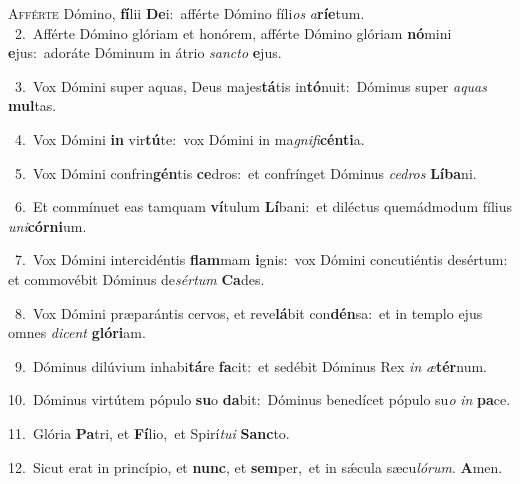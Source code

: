 \lettrine{\initial\textcolor{\initialcolor}{A}}{fférte} Dómino, \textbf{fí}\-lii \textbf{De}\-i:~\star afférte Dómino fíli\textit{os} \textit{a}\-\textbf{rí}\textbf{e}tum.\\
{\numbfont\textcolor{\numbcolor}{~2.}}~Afférte Dómino glóriam et honórem, afférte Dómino glóriam \textbf{nó}\-mini \textbf{e}\-jus:~\star adoráte Dóminum in átrio \textit{sanc}\-\textit{to} \textbf{e}\-jus.\par
{\numbfont\textcolor{\numbcolor}{~3.}}~Vox Dómini super aquas, Deus majes\-\textbf{tá}\-tis in\-\textbf{tó}\-nuit:~\star Dóminus super \textit{a}\-\textit{quas} \textbf{mul}\-tas.\par
{\numbfont\textcolor{\numbcolor}{~4.}}~Vox Dómini \textbf{in} vir\-\textbf{tú}\-te:~\star vox Dómini in ma\-\textit{gni}\-\textit{fi}\textbf{cén}\textbf{ti}a.\par
{\numbfont\textcolor{\numbcolor}{~5.}}~Vox Dómini confrin\-\textbf{gén}\-tis \textbf{ce}\-dros:~\star et confrínget Dóminus \textit{ce}\-\textit{dros} \textbf{Lí}\-\textbf{ba}ni.\par
{\numbfont\textcolor{\numbcolor}{~6.}}~Et commínuet eas tamquam \textbf{ví}\-tulum \textbf{Lí}\-bani:~\star et diléctus quemádmodum fílius \textit{u}\-\textit{ni}\textbf{cór}\textbf{ni}um.\par
{\numbfont\textcolor{\numbcolor}{~7.}}~Vox Dómini intercidéntis \textbf{flam}\-mam \textbf{i}\-gnis:~\star vox Dómini concutiéntis desértum: et commovébit Dóminus de\-\textit{sér}\-\textit{tum} \textbf{Ca}\-des.\par
{\numbfont\textcolor{\numbcolor}{~8.}}~Vox Dómini præparántis cervos, et reve\-\textbf{lá}\-bit con\-\textbf{dén}\-sa:~\star et in templo ejus omnes \textit{di}\-\textit{cent} \textbf{gló}\-\textbf{ri}am.\par
{\numbfont\textcolor{\numbcolor}{~9.}}~Dóminus dilúvium inhabi\-\textbf{tá}\-re \textbf{fa}\-cit:~\star et sedébit Dóminus Rex \textit{in} \textit{æ}\-\textbf{tér}num.\par
{\numbfont\textcolor{\numbcolor}{10.}}~Dóminus virtútem pópulo \textbf{su}\-o \textbf{da}\-bit:~\star Dóminus benedícet pópulo su\textit{o} \textit{in} \textbf{pa}\-ce.\par
{\numbfont\textcolor{\numbcolor}{11.}}~Glória \textbf{Pa}\-tri, et \textbf{Fí}\-lio,~\star et Spirí\-\textit{tu}\-\textit{i} \textbf{Sanc}\-to.\par
{\numbfont\textcolor{\numbcolor}{12.}}~Sicut erat in princípio, et \textbf{nunc}\-, et \textbf{sem}\-per,~\star et in sǽcula sæcu\-\textit{ló}\-\textit{rum}. \textbf{A}\-men.\par
